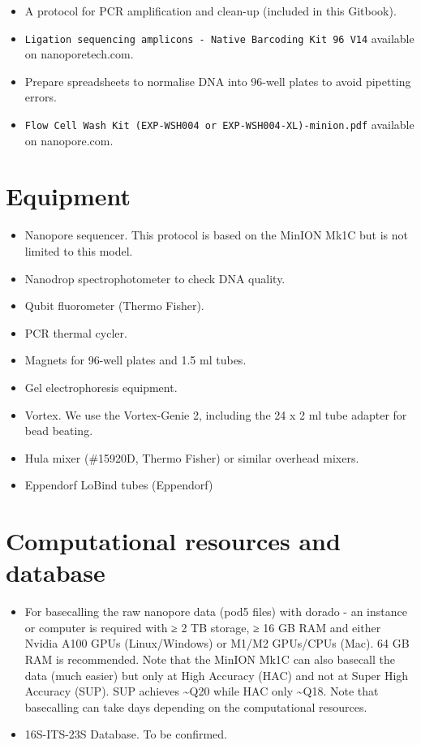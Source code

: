 \documentclass[
]{book}
\providecommand{\tightlist}{%
  \setlength{\itemsep}{0pt}\setlength{\parskip}{0pt}}
\begin{document}
\begin{itemize}
\tightlist
\item
  A protocol for PCR amplification and clean-up (included in this Gitbook).
\item
  \texttt{Ligation\ sequencing\ amplicons\ -\ Native\ Barcoding\ Kit\ 96\ V14} available on nanoporetech.com.
\item
  Prepare spreadsheets to normalise DNA into 96-well plates to avoid pipetting errors.
\item
  \texttt{Flow\ Cell\ Wash\ Kit\ (EXP-WSH004\ or\ EXP-WSH004-XL)-minion.pdf} available on nanopore.com.
\end{itemize}

\section{Equipment}\label{equipment}

\begin{itemize}
\tightlist
\item
  Nanopore sequencer. This protocol is based on the MinION Mk1C but is not limited to this model.
\item
  Nanodrop spectrophotometer to check DNA quality.
\item
  Qubit fluorometer (Thermo Fisher).
\item
  PCR thermal cycler.
\item
  Magnets for 96-well plates and 1.5 ml tubes.
\item
  Gel electrophoresis equipment.
\item
  Vortex. We use the Vortex-Genie 2, including the 24 x 2 ml tube adapter for bead beating.
\item
  Hula mixer (\#15920D, Thermo Fisher) or similar overhead mixers.
\item
  Eppendorf LoBind tubes (Eppendorf)
\end{itemize}

\section{Computational resources and database}\label{computational-resources-and-database}

\begin{itemize}
\tightlist
\item
  For basecalling the raw nanopore data (pod5 files) with dorado - an instance or computer is required with ≥ 2 TB storage, ≥ 16 GB RAM and either Nvidia A100 GPUs (Linux/Windows) or M1/M2 GPUs/CPUs (Mac). 64 GB RAM is recommended. Note that the MinION Mk1C can also basecall the data (much easier) but only at High Accuracy (HAC) and not at Super High Accuracy (SUP). SUP achieves \textasciitilde Q20 while HAC only \textasciitilde Q18. Note that basecalling can take days depending on the computational resources.
\item
  16S-ITS-23S Database. To be confirmed.
\end{itemize}
\end{document}
